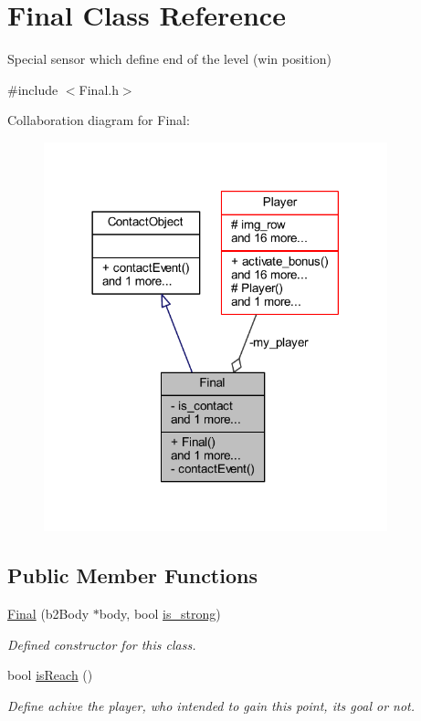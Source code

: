 \hypertarget{class_final}{}\section{Final Class Reference}
\label{class_final}


Special sensor which define end of the level (win position)  




{\ttfamily \#include $<$Final.\+h$>$}



Collaboration diagram for Final\+:
\nopagebreak
\begin{figure}[H]
\begin{center}
\leavevmode
\includegraphics[width=282pt]{class_final__coll__graph}
\end{center}
\end{figure}
\subsection*{Public Member Functions}
\begin{DoxyCompactItemize}
\item 
\hyperlink{class_final_ad8e4afdefd9ea952bfbb7123af09c710}{Final} (b2\+Body $\ast$body, bool \hyperlink{class_final_a4beb08f8f72e6339e8544ae121fb717d}{is\+\_\+strong})
\begin{DoxyCompactList}\small\item\em Defined constructor for this class. \end{DoxyCompactList}\item 
bool \hyperlink{class_final_af7a2beabd2de1cc0fcbe017f2012e41c}{is\+Reach} ()
\begin{DoxyCompactList}\small\item\em Define achive the player, who intended to gain this point, its goal or not. \end{DoxyCompactList}\end{DoxyCompactItemize}
